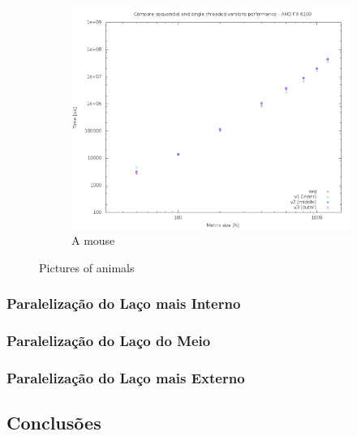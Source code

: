 \documentclass[a4paper, 12pt]{article}
\begin{document}
\begin{figure}
\begin{subfigure}[b]{0.3\textwidth}
        \label{fig:tiger}
    \end{subfigure}
    ~ %
    \begin{subfigure}[b]{0.3\textwidth}
        \includegraphics[width=\textwidth]{cmp_single_thread_HAL}
        \caption{A mouse}
        \label{fig:mouse}
    \end{subfigure}
    \caption{Pictures of animals}\label{fig:animals}
\end{figure}

\subsubsection{Paralelização do Laço mais Interno}

\subsubsection{Paralelização do Laço do Meio}

\subsubsection{Paralelização do Laço mais Externo}

\subsection{Conclusões} \label{sec:dis}

%
%
\end{document}
